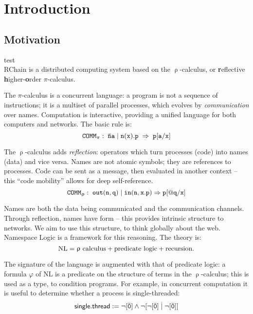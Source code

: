 \documentclass[stthol.tex]{subfiles}
\begin{document}
\section{Introduction}
\label{sec:intro}

\subsection{Motivation}
\cite{IEEEexample:shellCTANpage} test\\
RChain \cite{rchain} is a distributed computing system based on the  $\uprho$-calculus, or \textbf{r}eflective \textbf{h}igher-\textbf{o}rder $\pi$-calculus.

The $\pi$-calculus \cite{pical} is a concurrent language: a program is not a sequence of instructions; it is a multiset of parallel processes, which evolves by \textit{communication} over names. Computation is interactive, providing a unified language for both computers and networks. The basic rule is:
$$\mathtt{COMM_{\pi}: \; \bar{n}a \; \vert \; n(x).p \; \Rightarrow \; p[a/x]}$$

The $\uprho$-calculus \cite{rhocal} adds \textit{reflection}: operators which turn processes (code) into names (data) and vice versa. Names are not atomic symbols; they are references to processes. Code can be sent as a message, then evaluated in another context -- this ``code mobility'' allows for deep self-reference.
$$\mathtt{COMM_{\uprho}: \; out(n,q) \; \vert \; in(n,x.p) \Rightarrow p[@q/x]}$$

Names are both the data being communicated and the communication channels. Through reflection, names have form -- this provides intrinsic structure to networks. We aim to use this structure, to think globally about the web. Namespace Logic \cite{namespace} is a framework for this reasoning. The theory is:
$$\mathrm{NL} = \uprho \text{ calculus} + \text{predicate logic} + \text{recursion}.$$

The signature of the language is augmented with that of predicate logic: a formula $\varphi$ of NL is a predicate on the structure of terms in the $\uprho$-calculus; this is used as a type, to condition programs. For example, in concurrent computation it is useful to determine whether a process is single-threaded:
$$\msf{single.thread} := \neg[\ob{\ttz}]\land \neg[\neg[\ob{\ttz}] \obttp \neg[\ob{\ttz}]]$$
\end{document}
